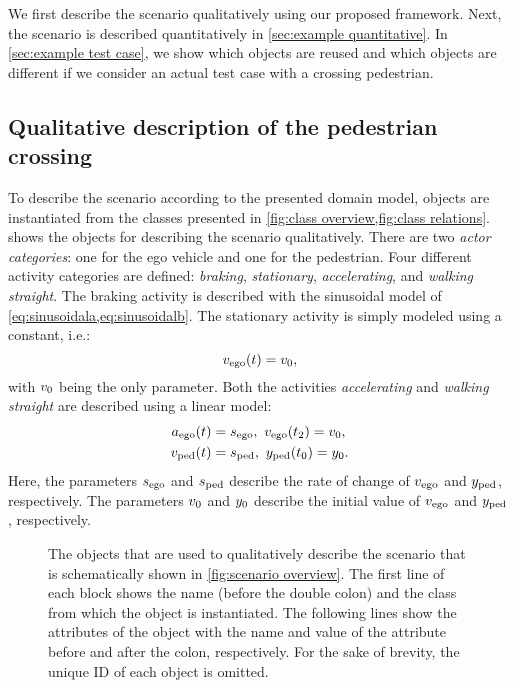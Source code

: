We first describe the scenario qualitatively using our proposed \cstartb framework\cendb. Next, the scenario is described quantitatively in \cref{sec:example quantitative}. 
In \cref{sec:example test case}, we show \cstarte which objects are reused and which objects are different if we consider an actual test case with a crossing pedestrian. \cende



\subsection{Qualitative description of the pedestrian crossing}
\label{sec:example qualitative}

To describe the scenario according to the presented domain model, objects are instantiated from the classes presented in \cref{fig:class overview,fig:class relations}.  shows the objects for describing the scenario qualitatively. There are two \textit{actor categories}: one for the ego vehicle and one for the pedestrian. Four different activity categories are defined: \emph{braking}, \emph{stationary}, \emph{accelerating}, and \emph{walking straight}. The braking activity is described with the sinusoidal model of \cref{eq:sinusoidala,eq:sinusoidalb}. The stationary activity is simply modeled using a constant, i.e.:
\begin{equation} \label{eq:constant model}
	\egospeed(\time) = \egospeedinitb,
\end{equation}
with $v_{0}$ being the only parameter.
Both the activities \emph{accelerating} and \emph{walking straight} are described using a linear model:
\begin{align}
	\egoacceleration(\time) &= \slopeego,\ \egospeed(\inittimec) = \egospeedinitc, \label{eq:ego accelerating} \\
	\pedspeed(\time) &= \slopepedestrian,\ \pednorth(\inittime) = \pednorthinit. \label{eq:pedestrian walking}
\end{align}
Here, the parameters $s_{\mathrm{ego}}$ and $s_{\mathrm{ped}}$ describe the rate of change of $v_{\mathrm{ego}}$ and $y_{\mathrm{ped}}$, respectively. The parameters $v_{0}$ and $y_{0}$ describe the initial value of $v_{\mathrm{ego}}$ and $y_{\mathrm{ped}}$, respectively.


\begin{figure*}[t]
	\centering
	
	\caption{The objects that are used to qualitatively describe the scenario that is schematically shown in \cref{fig:scenario overview}. The first line of each block shows the name (before the double colon) and the class from which the object is instantiated. The following lines show the attributes of the object with the name and value of the attribute before and after the colon, respectively. For the sake of brevity, the unique ID of each object is omitted.}
	\label{fig:example qualitative}
\end{figure*}


